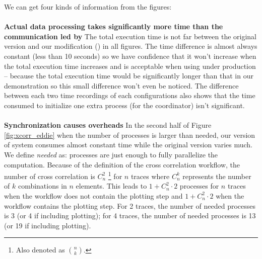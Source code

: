 We can get four kinds of information from the figures: \\\\
\textbf{Actual data processing takes significantly more time than the communication led by \tincdep}\quad
The total execution time is not far between the original \dpy version and our modification (\tincdep) in all figures. The time difference is almost always constant (less than 10 seconds) so we have confidence that it won't increase when the total execution time increases and is acceptable when using under production -- because the total execution time would be significantly longer than that in our demonstration so this small difference won't even be noticed. The difference between each two time recordings of each configurations also shows that the time consumed to initialize one extra process (for the coordinator) isn't significant. \\\\
\textbf{Synchronization causes overheads}\quad
In the second half of Figure \ref{fig:xcorr_eddie} when the number of processes is larger than needed, our version of system consumes almost constant time while the original version varies much. We define \emph{needed} as: processes are just enough to fully parallelize the computation. Because of the definition of the cross correlation workflow, the number of cross correlation is $C^2_n$ \footnote{Also denoted as $\binom{n}{k}$.} for $n$ traces where $C^k_n$ represents the number of $k$ combinations in $n$ elements. This leads to $1+C^2_n \cdot 2$ processes for $n$ traces when the workflow does not contain the plotting step and $1+C^2_n \cdot 2$ when the workflow contains the plotting step. For 2 traces, the number of needed processes is 3 (or 4 if including plotting); for 4 traces, the number of needed processes is 13 (or 19 if including plotting).

